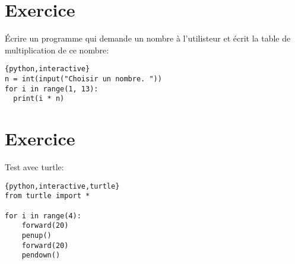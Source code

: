 \documentclass[a4paper,11pt]{article}
\begin{document}
\section{Exercice}
Écrire un programme qui demande un nombre à l'utilisteur et écrit la table de multiplication de ce nombre:\\
\begin{solution}
\begin{verbatim}{python,interactive}
n = int(input("Choisir un nombre. "))
for i in range(1, 13):
  print(i * n)
\end{verbatim}
\end{solution}

\section{Exercice}
Test avec turtle:\\
\begin{solution}
\begin{verbatim}{python,interactive,turtle}
from turtle import *

for i in range(4):
    forward(20)
    penup()
    forward(20)
    pendown()
\end{verbatim}
\end{solution}
\end{document}
